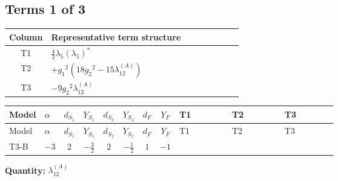 \documentclass[8pt]{article}
\begin{document}
\begin{landscape}
\subsection*{Terms 1 of 3}
\begin{center}
\begin{tabular}{@{}c >{\raggedright\arraybackslash}p{0.82\linewidth}@{}}
\toprule
Column & Representative term structure \\
\midrule
T1 & \(\displaystyle \frac{4}{3} {\lambda_5} \left({\lambda_5}\right)^{*}\) \\
\midrule
T2 & \(\displaystyle +{g_1}^2 \left(18 {g_2}^2-15 {\lambda_{12}^{(A)}}\right)\) \\
\midrule
T3 & \(\displaystyle -9 {g_2}^2 {\lambda_{12}^{(A)}}\) \\
\midrule
\bottomrule
\end{tabular}
\end{center}
\smallskip
\tiny
\begin{longtable}{@{}llcccccc >{\raggedright\arraybackslash}p{0.21\linewidth} >{\raggedright\arraybackslash}p{0.21\linewidth} >{\raggedright\arraybackslash}p{0.21\linewidth}@{}}
\toprule
Model & $\alpha$ & $d_{S_1}$ & $Y_{S_1}$ & $d_{S_2}$ & $Y_{S_2}$ & $d_F$ & $Y_F$ & T1 & T2 & T3 \\
\midrule
\endfirsthead
\toprule
Model & $\alpha$ & $d_{S_1}$ & $Y_{S_1}$ & $d_{S_2}$ & $Y_{S_2}$ & $d_F$ & $Y_F$ & T1 & T2 & T3 \\
\midrule
\endhead
T3-B & $-3$ & $2$ & $-\frac{3}{2}$ & $2$ & $-\frac{1}{2}$ & $1$ & $-1$ & \scriptsize\adjustbox{max width=\linewidth}{$\begin{gathered} \frac{4}{3} {\lambda_5} \left({\lambda_5}\right)^{*}\end{gathered}$} & \scriptsize\adjustbox{max width=\linewidth}{$\begin{gathered} +{g_1}^2 \left(18 {g_2}^2-15 {\lambda_{12}^{(A)}}\right)\end{gathered}$} & \scriptsize\adjustbox{max width=\linewidth}{$\begin{gathered} -9 {g_2}^2 {\lambda_{12}^{(A)}}\end{gathered}$} \\
\midrule
\bottomrule
\end{longtable}
\clearpage
\noindent\textbf{Quantity: }$\lambda_{12}^{(A)}$\par\smallskip

\end{landscape}
\end{document}
